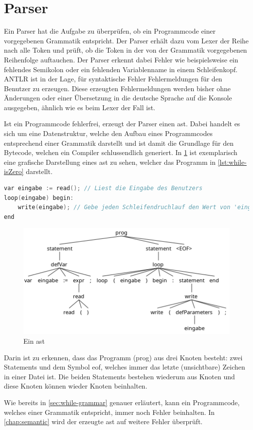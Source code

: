 \section{Parser} \label{sec:parser}
Ein Parser hat die Aufgabe zu überprüfen, ob ein Programmcode einer vorgegebenen Grammatik entspricht. Der Parser erhält dazu vom Lexer der Reihe nach alle Token und prüft, ob die Token in der von der Grammatik vorgegebenen Reihenfolge auftauchen. Der Parser erkennt dabei Fehler wie beispielsweise ein fehlendes Semikolon oder ein fehlenden Variablenname in einem Schleifenkopf. ANTLR ist in der Lage, für syntaktische Fehler Fehlermeldungen für den Benutzer zu erzeugen. Diese erzeugten Fehlermeldungen werden bisher ohne Änderungen oder einer Übersetzung in die deutsche Sprache auf die Konsole ausgegeben, ähnlich wie es beim Lexer der Fall ist.

Ist ein Programmcode fehlerfrei, erzeugt der Parser einen \ac{ast}. Dabei handelt es sich um eine Datenstruktur, welche den Aufbau eines Programmcodes entsprechend einer Grammatik darstellt und ist damit die Grundlage für den Bytecode, welchen ein Compiler schlussendlich generiert. In \cref{pic:isZeroAST} ist exemplarisch eine grafische Darstellung eines \ac{ast} zu sehen, welcher das Programm in \cref{lst:while-isZero} darstellt. 

\begin{lstlisting}[language=c, caption=Prueft ob ein Wert 0 ist, label={lst:while-isZero}]
var eingabe := read(); // Liest die Eingabe des Benutzers
loop(eingabe) begin:
	write(eingabe); // Gebe jeden Schleifendruchlauf den Wert von 'eingabe' aus
end
\end{lstlisting}

\begin{figure}[h!]
	\centering
	\includegraphics[width=12cm]{content/pictures/ast.png}
	\caption{Ein \acl{ast}}
	\label{pic:isZeroAST}
\end{figure}

Darin ist zu erkennen, dass das Programm (prog) aus drei Knoten besteht: zwei Statements und dem Symbol \ac{eof}, welches immer das letzte (unsichtbare) Zeichen in einer Datei ist. Die beiden Statements bestehen wiederum aus Knoten und diese Knoten können wieder Knoten beinhalten. 

Wie bereits in \cref{sec:while-grammar} genauer erläutert, kann ein Programmcode, welches einer Grammatik entspricht, immer noch Fehler beinhalten. In \cref{chap:semantic} wird der erzeugte \ac{ast} auf weitere Fehler überprüft.